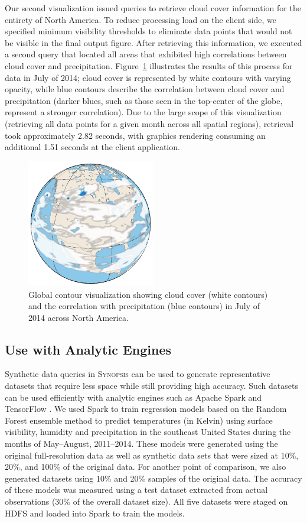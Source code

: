 \documentclass[9pt,journal,compsoc]{IEEEtran}
\begin{document}
Our second visualization issued queries to retrieve cloud cover information for the entirety of North America. To reduce processing load on the client side, we specified minimum visibility thresholds to eliminate data points that would not be visible in the final output figure. After retrieving this information, we executed a second query that located all areas that exhibited high correlations between cloud cover and precipitation. Figure~\ref{fig:global-contour} illustrates the results of this process for data in July of 2014; cloud cover is represented by white contours with varying opacity, while blue contours describe the correlation between cloud cover and precipitation (darker blues, such as those seen in the top-center of the globe, represent a stronger correlation). Due to the large scope of this visualization (retrieving all data points for a given month across all spatial regions), retrieval took approximately 2.82 seconds, with graphics rendering consuming an additional 1.51 seconds at the client application.
%
\begin{figure}[b]
    \centerline{\includegraphics[width=2.2in]{figures/globe.pdf}}
    \caption{Global contour visualization showing cloud cover (white contours) and the correlation with precipitation (blue contours) in July of 2014 across North America.}
    \label{fig:global-contour}
\end{figure}

\subsection{Use with Analytic Engines}
Synthetic data queries in \textsc{Synopsis} can be used to generate representative datasets that require less space while still providing high accuracy.  
Such datasets can be used efficiently with analytic engines such as Apache Spark \cite{zaharia2010spark} and TensorFlow \cite{tensorflow}.  
We used Spark to train regression models based on the Random Forest ensemble method to predict temperatures (in Kelvin) using surface visibility, humidity and precipitation in the southeast United States during the months of May--August, 2011--2014.
These models were generated using the original full-resolution data as well as synthetic data sets that were sized at 10\%, 20\%, and 100\% of the original data.
For another point of comparison, we also generated datasets using 10\% and 20\% samples of the original data.
The accuracy of these models was measured using a test dataset extracted from actual observations (30\% of the overall dataset size).
All five datasets were staged on HDFS and loaded into Spark to train the models.
\end{document}
